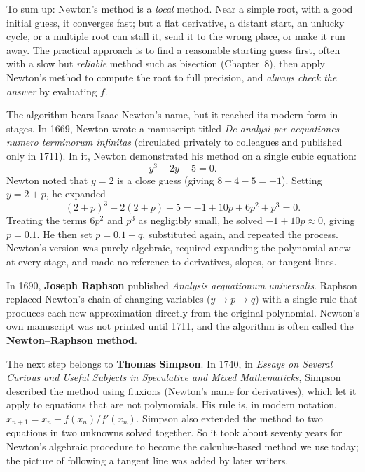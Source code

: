 \begin{intuitionbox}
To sum up: Newton's method is a \emph{local} method. Near a simple root,
with a good initial guess, it converges fast; but a
flat derivative, a distant start, an unlucky cycle, or a multiple root can stall
it, send it to the wrong place, or make it run away. The practical approach is to
find a reasonable starting guess first, often with a slow but \emph{reliable}
method such as bisection (Chapter~8), then apply Newton's method to compute the
root to full precision, and \emph{always check the answer} by evaluating $f$.
\end{intuitionbox}

\begin{historybox}
The algorithm bears Isaac Newton's name, but it reached its modern form in stages. In 1669, Newton wrote a manuscript titled \emph{De analysi per aequationes numero terminorum infinitas} (circulated privately to colleagues and published only in 1711). In it, Newton demonstrated his method on a single cubic equation:
\[
  y^3 - 2y - 5 = 0.
\]
Newton noted that $y=2$ is a close guess (giving $8 - 4 - 5 = -1$). Setting $y = 2 + p$, he expanded
\[
  (2+p)^3 - 2(2+p) - 5 = -1 + 10p + 6p^2 + p^3 = 0.
\]
Treating the terms $6p^2$ and $p^3$ as negligibly small, he solved $-1 + 10p \approx 0$, giving $p = 0.1$. He then set $p = 0.1 + q$, substituted again, and repeated the process. Newton's version was purely algebraic, required expanding the polynomial anew at every stage, and made no reference to derivatives, slopes, or tangent lines.

In 1690, \textbf{Joseph Raphson} published \emph{Analysis aequationum universalis}. Raphson replaced Newton's chain of changing variables ($y \to p \to q$) with a single rule that produces each new approximation directly from the original polynomial. Newton's own manuscript was not printed until 1711, and the algorithm is often called the \textbf{Newton--Raphson method}.

The next step belongs to \textbf{Thomas Simpson}. In 1740, in \emph{Essays on Several Curious and Useful Subjects in Speculative and Mixed Mathematicks}, Simpson described the method using fluxions (Newton's name for derivatives), which let it apply to equations that are not polynomials. His rule is, in modern notation, $x_{n+1} = x_n - f(x_n)/f'(x_n)$. Simpson also extended the method to two equations in two unknowns solved together. So it took about seventy years for Newton's algebraic procedure to become the calculus-based method we use today; the picture of following a tangent line was added by later writers.


\end{historybox}
